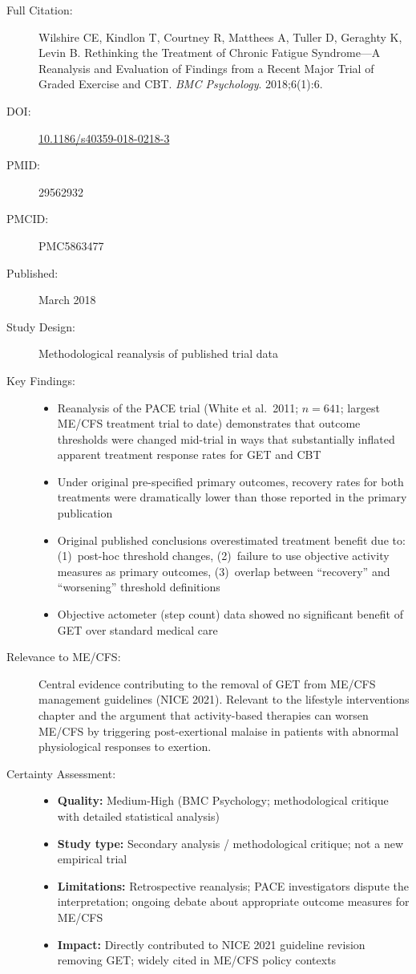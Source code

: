 \begin{description}
    \item[Full Citation:] Wilshire CE, Kindlon T, Courtney R, Matthees A, Tuller D, Geraghty K, Levin B. Rethinking the Treatment of Chronic Fatigue Syndrome---A Reanalysis and Evaluation of Findings from a Recent Major Trial of Graded Exercise and CBT. \textit{BMC Psychology}. 2018;6(1):6.
    \item[DOI:] \href{https://doi.org/10.1186/s40359-018-0218-3}{10.1186/s40359-018-0218-3}
    \item[PMID:] 29562932
    \item[PMCID:] PMC5863477
    \item[Published:] March 2018
    \item[Study Design:] Methodological reanalysis of published trial data
    \item[Key Findings:]
    \begin{itemize}
        \item Reanalysis of the PACE trial (White et al.\ 2011; $n=641$; largest ME/CFS treatment trial to date) demonstrates that outcome thresholds were changed mid-trial in ways that substantially inflated apparent treatment response rates for GET and CBT
        \item Under original pre-specified primary outcomes, recovery rates for both treatments were dramatically lower than those reported in the primary publication
        \item Original published conclusions overestimated treatment benefit due to: (1)~post-hoc threshold changes, (2)~failure to use objective activity measures as primary outcomes, (3)~overlap between ``recovery'' and ``worsening'' threshold definitions
        \item Objective actometer (step count) data showed no significant benefit of GET over standard medical care
    \end{itemize}
    \item[Relevance to ME/CFS:] Central evidence contributing to the removal of GET from ME/CFS management guidelines (NICE 2021). Relevant to the lifestyle interventions chapter and the argument that activity-based therapies can worsen ME/CFS by triggering post-exertional malaise in patients with abnormal physiological responses to exertion.
    \item[Certainty Assessment:]
    \begin{itemize}
        \item \textbf{Quality:} Medium-High (BMC Psychology; methodological critique with detailed statistical analysis)
        \item \textbf{Study type:} Secondary analysis / methodological critique; not a new empirical trial
        \item \textbf{Limitations:} Retrospective reanalysis; PACE investigators dispute the interpretation; ongoing debate about appropriate outcome measures for ME/CFS
        \item \textbf{Impact:} Directly contributed to NICE 2021 guideline revision removing GET; widely cited in ME/CFS policy contexts
    \end{itemize}
\end{description}

